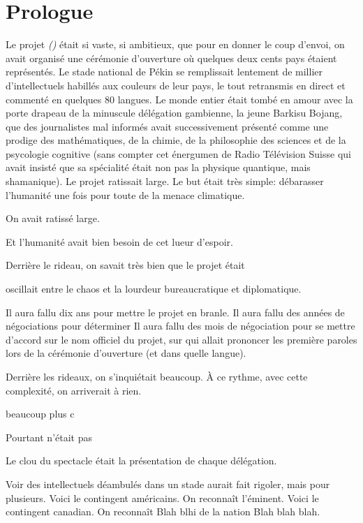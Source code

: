 \chapter*{Prologue}

Le projet \textit{\nomProjet{} (\nomProjetEn{})} était si vaste, si ambitieux,
que pour en donner le coup d'envoi, on avait organisé une cérémonie d'ouverture
où quelques deux cents pays étaient représentés.  
%
Le stade national de Pékin se remplissait lentement de millier d'intellectuels
habillés aux couleurs de leur pays, le tout retransmis en direct et commenté en
quelques 80 langues.
%
Le monde entier était tombé en amour avec la porte drapeau de la minuscule
délégation gambienne, la jeune Barkisu Bojang, que des journalistes mal
informés avait successivement présenté comme une prodige des mathématiques, de
la chimie, de la philosophie des sciences et de la psycologie cognitive (sans
compter cet énergumen de Radio Télévision Suisse qui avait insisté que sa
spécialité était non pas la physique quantique, mais shamanique).
%
Le projet \nomProjet{} ratissait large. Le but était très simple: débarasser
l'humanité une fois pour toute de la menace climatique.


On avait ratissé large.


Et l'humanité avait bien besoin de cet lueur d'espoir.

Derrière le rideau, on savait très bien que le projet \nomProjet{} était 

oscillait entre le chaos et la lourdeur bureaucratique et diplomatique.

Il aura fallu dix ans pour mettre le projet en branle.
Il aura fallu des années de négociations pour déterminer
Il aura fallu des mois de négociation pour se mettre d'accord sur le nom officiel du projet, sur qui allait prononcer les première paroles
lors de la cérémonie d'ouverture (et dans quelle langue).

Derrière les rideaux, on s'inquiétait beaucoup.
À ce rythme, avec cette complexité, on arriverait à rien.

beaucoup plus c

Pourtant \nomProjet{} n'était pas 






Le clou du spectacle était la présentation de chaque délégation.



Voir des intellectuels déambulés dans un stade aurait fait rigoler, mais pour
plusieurs. Voici le contingent américains. On reconnaît l'éminent.
Voici le contingent canadian. 
On reconnaît Blah blhi de la nation Blah blah blah.


